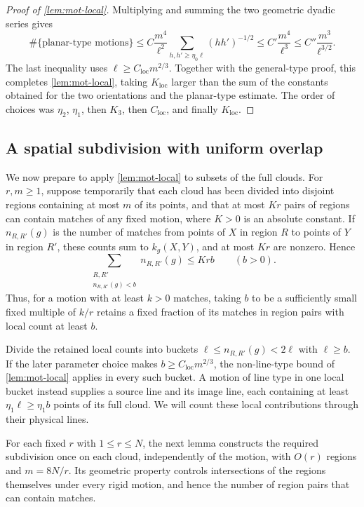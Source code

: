 \begin{proof}[Proof of \cref{lem:mot-local}]
Multiplying and summing the two geometric dyadic series gives
\[
 \#\{\text{planar-type motions}\}
 \le C\frac{m^4}{\ell^2}
      \sum_{h,h'\ge\eta_0\ell}(hh')^{-1/2}
 \le C'\frac{m^4}{\ell^3}
 \le C''\frac{m^3}{\ell^{3/2}}.
\]
The last inequality uses $\ell\ge C_{\mathrm{loc}}m^{2/3}$. Together with the general-type proof, this completes \cref{lem:mot-local}, taking $K_{\mathrm{loc}}$ larger than the sum of the constants obtained for the two orientations and the planar-type estimate.  The order of choices was $\eta_2$, $\eta_1$, then $K_3$, then $C_{\mathrm{loc}}$, and finally $K_{\mathrm{loc}}$.
\end{proof}

\subsection{A spatial subdivision with uniform overlap}

We now prepare to apply \cref{lem:mot-local} to subsets of the full clouds.  For $r,m\ge1$, suppose temporarily that each cloud has been divided into disjoint regions containing at most $m$ of its points, and that at most $Kr$ pairs of regions can contain matches of any fixed motion, where $K>0$ is an absolute constant.  If $n_{R,R'}(g)$ is the number of matches from points of $X$ in region $R$ to points of $Y$ in region $R'$, these counts sum to $k_g(X,Y)$, and at most $Kr$ are nonzero.  Hence
\begin{equation}
\label{eq:mot-region-discard}
 \sum_{\substack{R,R'\\ n_{R,R'}(g)<b}} n_{R,R'}(g)\le Krb
 \qquad(b>0).
\end{equation}
Thus, for a motion with at least $k>0$ matches, taking $b$ to be a sufficiently small fixed multiple of $k/r$ retains a fixed fraction of its matches in region pairs with local count at least $b$.

Divide the retained local counts into buckets $\ell\le n_{R,R'}(g)<2\ell$ with $\ell\ge b$.  If the later parameter choice makes $b\ge C_{\mathrm{loc}}m^{2/3}$, the non-line-type bound of \cref{lem:mot-local} applies in every such bucket.  A motion of line type in one local bucket instead supplies a source line and its image line, each containing at least $\eta_1\ell\ge\eta_1b$ points of its full cloud.  We will count these local contributions through their physical lines.

For each fixed $r$ with $1\le r\le N$, the next lemma constructs the required subdivision once on each cloud, independently of the motion, with $O(r)$ regions and $m=8N/r$. Its geometric property controls intersections of the regions themselves under every rigid motion, and hence the number of region pairs that can contain matches.

